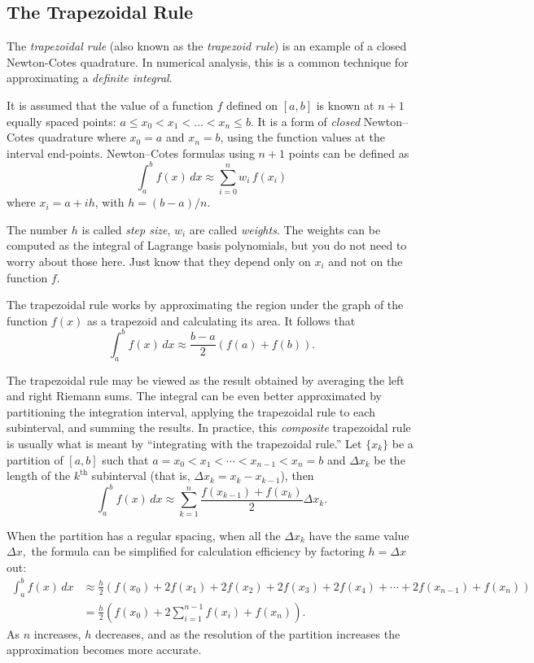 \subsection{The Trapezoidal Rule}

The \emph{trapezoidal rule} (also known as the \emph{trapezoid rule}) is an
example of a closed Newton-Cotes quadrature. In numerical analysis,
this is a common technique for approximating a \emph{definite integral}.

It is assumed that the value of a function $f$ defined on $[a,b]$
is known at $n+1$ equally spaced points: $a \leq x_0 < x_1 < \dots
< x_n \leq b$. It is a form of \emph{closed} Newton–Cotes quadrature where
$x_0 = a$ and $x_n = b$, using
the function values at the interval end-points.
Newton–Cotes formulas using $n+1$ points can be
defined as
$$\int_a^b f(x) \,dx \approx \sum_{i=0}^n w_i\, f(x_i)$$
where $x_i = a + i h$, with
$h = (b-a)/n$.

The number $h$ is called \emph{step size}, $w_i$ are called \emph{weights}. The
weights can be computed as the integral of Lagrange basis polynomials, but you
do not need to worry about those here. Just know that they depend only on $x_i$
and not on the function $f$.

The trapezoidal rule works by approximating the region under the graph
of the function $f(x)$ as a trapezoid and calculating its area. It
follows that
$$
\int_{a}^{b} f(x) \, dx \approx \frac{b-a}{2} \left( f(a)+f(b) \right).
$$

The trapezoidal rule may be viewed as the result obtained by averaging
the left and right Riemann sums. The
integral can be even better approximated by partitioning the integration
interval, applying the trapezoidal rule to each subinterval, and summing
the results. In practice, this \emph{composite}
trapezoidal rule is usually what is meant by ``integrating with the
trapezoidal rule.'' Let $\{x_k\}$ be a partition of $[a,b]$ such that
$a=x_0 < x_1 < \cdots < x_{n-1} < x_n = b$ and $\Delta x_k$ be the
length of the $k^\text{th}$ subinterval (that is, $\Delta x_k = x_k -
x_{k-1}$), then
$$
\int_a^b f(x) \, dx \approx \sum_{k=1}^n \frac{f(x_{k-1}) + f(x_k)}{2} \Delta x_k.
$$

When the partition has a regular spacing,
when all the $\Delta x_k$ have the same value $\Delta x,$ the formula
can be simplified for calculation efficiency by factoring $h=\Delta x$
out:
\begin{align*}
\int_a^b f(x) \, dx & \approx \frac{h}{2}
\left(f(x_0) + 2f(x_1) + 2f(x_2) + 2f(x_3) + 2f(x_4) + \cdots +
2f(x_{n-1}) + f(x_n)\right) \\
& = \frac{h}{2}
\left(f(x_0) + 2\sum_{i=1}^{n-1} f(x_i) + f(x_n)\right).
\end{align*}
As $n$ increases, $h$ decreases, and as the resolution of the
partition increases the approximation becomes more accurate.

